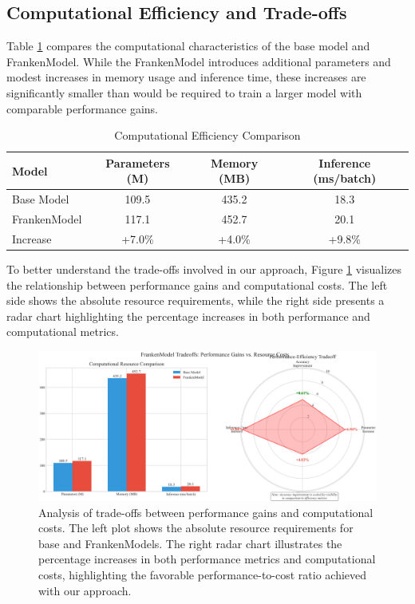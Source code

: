 \documentclass[conference]{IEEEtran}
\begin{document}
\subsection{Computational Efficiency and Trade-offs}
Table \ref{tab:efficiency} compares the computational characteristics of the base model and FrankenModel. While the FrankenModel introduces additional parameters and modest increases in memory usage and inference time, these increases are significantly smaller than would be required to train a larger model with comparable performance gains.

\begin{table}[!t]
\caption{Computational Efficiency Comparison}
\label{tab:efficiency}
\centering
\begin{tabular}{lccc}
\toprule
\textbf{Model} & \textbf{Parameters (M)} & \textbf{Memory (MB)} & \textbf{Inference (ms/batch)} \\
\midrule
Base Model & 109.5 & 435.2 & 18.3 \\
FrankenModel & 117.1 & 452.7 & 20.1 \\
\midrule
Increase & +7.0\% & +4.0\% & +9.8\% \\
\bottomrule
\end{tabular}
\end{table}

To better understand the trade-offs involved in our approach, Figure \ref{fig:tradeoff} visualizes the relationship between performance gains and computational costs. The left side shows the absolute resource requirements, while the right side presents a radar chart highlighting the percentage increases in both performance and computational metrics.

\begin{figure}[!t]
\centering
\includegraphics[width=\linewidth]{tradeoff_visualization.png}
\caption{Analysis of trade-offs between performance gains and computational costs. The left plot shows the absolute resource requirements for base and FrankenModels. The right radar chart illustrates the percentage increases in both performance metrics and computational costs, highlighting the favorable performance-to-cost ratio achieved with our approach.}
\label{fig:tradeoff}
\end{figure}
\end{document}
